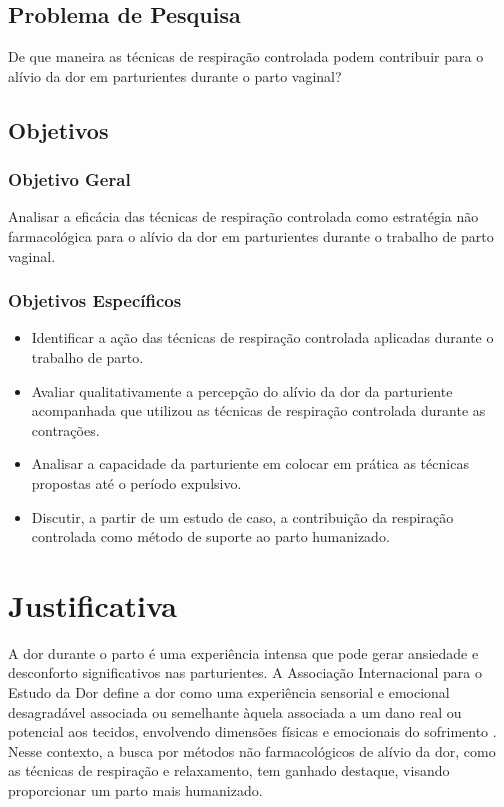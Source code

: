 \documentclass[openright]{normas-utf-tex}
\begin{document}
\section{Problema de Pesquisa}
\label{sec:problema}

De que maneira as técnicas de respiração controlada podem contribuir para o alívio da dor em parturientes durante o parto vaginal?

\section{Objetivos}
\label{sec:objetivos}

\subsection{Objetivo Geral}
\label{subsec:objetivo-geral}

Analisar a eficácia das técnicas de respiração controlada como estratégia não farmacológica para o alívio da dor em parturientes durante o trabalho de parto vaginal.

\subsection{Objetivos Específicos}
\label{subsec:objetivos-especificos}

\begin{itemize}
    \item Identificar a ação das técnicas de respiração controlada aplicadas durante o trabalho de parto.
    \item Avaliar qualitativamente a percepção do alívio da dor da parturiente acompanhada que utilizou as técnicas de respiração controlada durante as contrações.
    \item Analisar a capacidade da parturiente em colocar em prática as técnicas propostas até o período expulsivo.
    \item Discutir, a partir de um estudo de caso, a contribuição da respiração controlada como método de suporte ao parto humanizado.
\end{itemize}

\chapter{Justificativa}
\label{chap:justificativa}

A dor durante o parto é uma experiência intensa que pode gerar ansiedade e desconforto significativos nas parturientes. A Associação Internacional para o Estudo da Dor define a dor como uma experiência sensorial e emocional desagradável associada ou semelhante àquela associada a um dano real ou potencial aos tecidos, envolvendo dimensões físicas e emocionais do sofrimento \cite{raja2020}. Nesse contexto, a busca por métodos não farmacológicos de alívio da dor, como as técnicas de respiração e relaxamento, tem ganhado destaque, visando proporcionar um parto mais humanizado.
\end{document}
